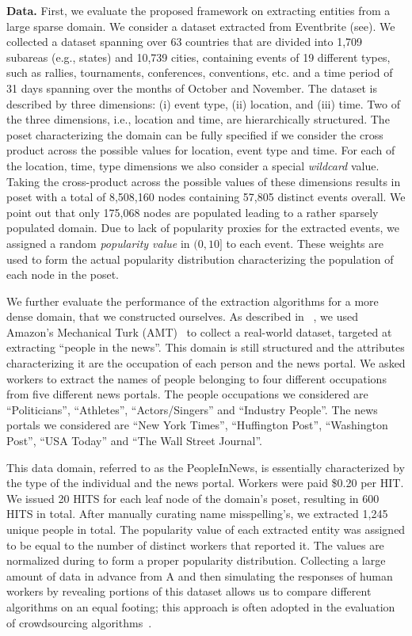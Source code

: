 \vspace{5pt}\noindent\textbf{Data.} First, we evaluate the proposed framework on extracting entities from a large sparse domain. We consider a dataset extracted from Eventbrite (see). We collected a dataset spanning over 63 countries that are divided into 1,709 subareas (e.g., states) and 10,739 cities, containing events of 19 different types, such as rallies, tournaments, conferences, conventions, etc. and a time period of 31 days spanning over the months of October and November. The dataset is described by three dimensions: (i) event type, (ii) location, and (iii) time. Two of the three dimensions, i.e., location and time, are hierarchically structured. The poset characterizing the domain can be fully specified if we consider the cross product across the possible values for location, event type and time. For each of the location, time, type dimensions we also consider a special {\em wildcard} value. Taking the cross-product across the possible values of these dimensions results in poset with a total of 8,508,160 nodes containing 57,805 distinct events overall. We point out that only 175,068 nodes are populated leading to a rather sparsely populated domain. Due to lack of popularity proxies for the extracted events, we assigned a random {\em popularity value} in $(0,10]$ to each event. These weights are used to form the actual popularity distribution characterizing the population of each node in the poset. 

We further evaluate the performance of the extraction algorithms for a more dense domain, that we constructed ourselves. As described in ~, we used Amazon's Mechanical Turk (AMT)~\cite{mturk} to collect a real-world dataset, targeted at extracting ``people in the news''. This domain is still structured and the attributes characterizing it are the occupation of each person and the news portal. We asked workers to extract the names of people belonging to four different occupations from five different news portals. The people occupations we considered are ``Politicians'', ``Athletes'', ``Actors/Singers'' and ``Industry People''. The news portals we considered are ``New York Times'', ``Huffington Post'', ``Washington Post'', ``USA  Today'' and ``The Wall Street Journal''. 

This data domain, referred to as the PeopleInNews, is essentially characterized by the type of the individual and the news portal. Workers were paid \$0.20 per HIT. We issued 20 HITS for each leaf node of the domain's poset, resulting in 600 HITS in total. After manually curating name misspelling's, we extracted 1,245 unique people in total. The popularity value of each extracted entity was assigned to be equal to the number of distinct workers that reported it. The values are normalized during to form a proper popularity distribution. Collecting a large amount of data in advance from A and then simulating the responses of human workers by revealing portions of this dataset allows us to compare different algorithms on an equal footing; this approach is often adopted in the evaluation of crowdsourcing algorithms~\cite{DBLP:journals/pvldb/ParameswaranBG0PW14, marcus:2011,trushkowsky:2013}.

